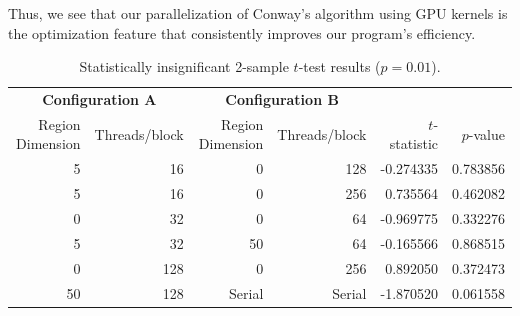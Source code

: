 \documentclass[onecolumn,12pt]{IEEEtran}
\begin{document}
  Thus, we see that our parallelization of Conway's algorithm using GPU kernels
  is the optimization feature that consistently improves our program's
  efficiency.

  \begin{table}
    \centering
    \caption{Statistically insignificant 2-sample $t$-test results ($p = 0.01$).}
    \begin{tabular}{rrrrrr} \toprule
      \multicolumn{2}{c}{\textbf{Configuration A}} &
      \multicolumn{2}{c}{\textbf{Configuration B}}
      \\
      Region Dimension & Threads/block &  Region Dimension & Threads/block &
      $t$-statistic & $p$-value \\ \midrule
      5  & 16  &      0 &   128  & -0.274335 & 0.783856 \\
      5  & 16  &      0 &   256  &  0.735564 & 0.462082 \\
      0  & 32  &      0 &    64  & -0.969775 & 0.332276 \\
      5  & 32  &     50 &    64  & -0.165566 & 0.868515 \\
      0  & 128 &      0 &   256  &  0.892050 & 0.372473 \\
      50 & 128 & Serial & Serial & -1.870520 & 0.061558 \\ \bottomrule
    \end{tabular}
    \label{tab:stats}
  \end{table}

  
\end{document}
